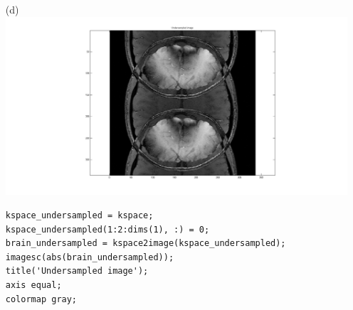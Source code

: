 \documentclass{article}
\begin{document}
\begin{enumerate}
\begin{enumerate}
\newpage

	\item[(d)]
		$\;$\\ \includegraphics[width=\textwidth]{../images/BrainAliased} \\
\begin{lstlisting}   
kspace_undersampled = kspace;
kspace_undersampled(1:2:dims(1), :) = 0;
brain_undersampled = kspace2image(kspace_undersampled);
imagesc(abs(brain_undersampled));
title('Undersampled image');
axis equal;
colormap gray;
\end{lstlisting}
	\end{enumerate}

\newpage


\end{enumerate}
\end{document}
